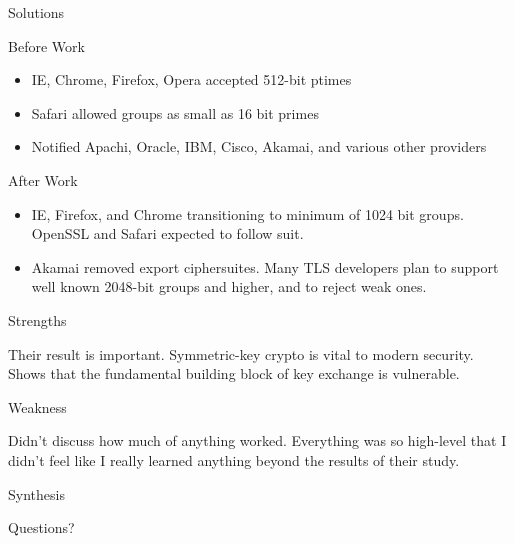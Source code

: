 \documentclass[presentation, aspectratio=54]{beamer}
\begin{document}
\begin{frame}{Solutions}

Before Work
\begin{itemize}
\item IE, Chrome, Firefox, Opera accepted 512-bit ptimes
\item Safari allowed groups as small as 16 bit primes
\item Notified Apachi, Oracle, IBM, Cisco, Akamai, and various other providers
\end{itemize}
After Work
\begin{itemize}
\item IE, Firefox, and Chrome transitioning to minimum of 1024 bit groups.
      OpenSSL and Safari expected to follow suit.
\item Akamai removed export ciphersuites. Many TLS developers plan to support
      well known 2048-bit groups and higher, and to reject weak ones.
\end{itemize}
\end{frame}


\begin{frame}{Strengths}

Their result is important. Symmetric-key crypto is vital to modern security.
Shows that the fundamental building block of key exchange is vulnerable.

\end{frame}


\begin{frame}{Weakness}

Didn't discuss how much of anything worked. Everything was so high-level that I
didn't feel like I really learned anything beyond the results of their study.

\end{frame}


\begin{frame}{Synthesis}


\end{frame}


\begin{frame}{Questions?}
\end{frame}

\end{document}
